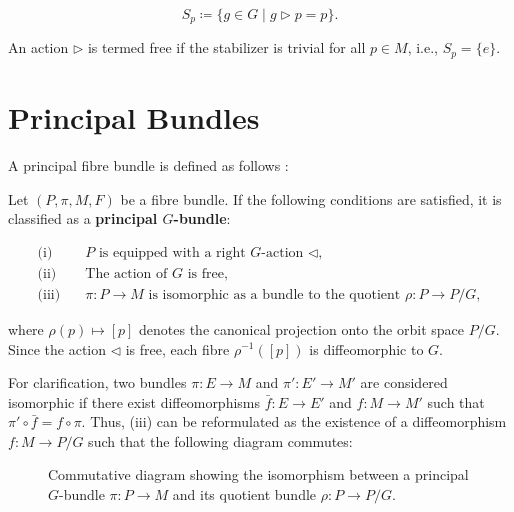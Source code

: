 \[
S_p \coloneqq \{g \in G \mid g \triangleright p = p \}.
\]

An action \(\triangleright\) is termed free if the stabilizer is trivial for all \(p \in M\), i.e., \(S_p = \{e\}\).


\section{Principal Bundles}

A principal fibre bundle is defined as follows \cite{DudekEhreshmanntheoryconnectionprincipalbundlecompendiumphysicists2018}:

Let \( (P, \pi, M, F) \) be a fibre bundle. If the following conditions are satisfied, it is classified as a \textbf{principal \( G \)-bundle}:

\begin{align*}
  \text{(i)}\quad & P \text{ is equipped with a right } G\text{-action } \triangleleft, \\
  \text{(ii)}\quad & \text{The action of } G \text{ is free}, \\
  \text{(iii)}\quad & \pi : P \to M \text{ is isomorphic as a bundle to the quotient } \rho : P \to P/G,
\end{align*}

where \( \rho(p) \mapsto [p] \) denotes the canonical projection onto the orbit space \( P/G \). Since the action \( \triangleleft \) is free, each fibre \( \rho^{-1}([p]) \) is diffeomorphic to \( G \).

For clarification, two bundles \( \pi: E \to M \) and \( \pi': E' \to M' \) are considered isomorphic if there exist diffeomorphisms \( \bar{f}: E \to E' \) and \( f: M \to M' \) such that \( \pi' \circ \bar{f} = f \circ \pi \). Thus, (iii) can be reformulated as the existence of a diffeomorphism \( f : M \to P/G \) such that the following diagram commutes:
\begin{figure}[h!]
\centering
{}
\caption{Commutative diagram showing the isomorphism between a principal $G$-bundle \(\pi : P \to M\) and its quotient bundle \(\rho : P \to P/G\).}
\end{figure}


